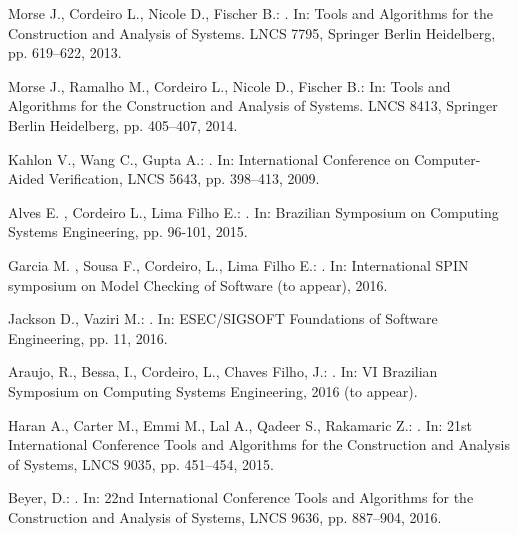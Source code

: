 \documentclass{acm_sen_article}
\begin{document}
{{\begin{thebibliography}{1}
Morse J., Cordeiro L., Nicole D., Fischer B.:
.
\newblock In: Tools and Algorithms for the Construction and Analysis of
  Systems. LNCS 7795, Springer Berlin Heidelberg, pp. 619--622, 2013.

Morse J., Ramalho M., Cordeiro L., Nicole D., Fischer B.:
\newblock In: Tools and Algorithms for the Construction and Analysis of
  Systems. LNCS 8413, Springer Berlin Heidelberg, pp. 405--407, 2014.

Kahlon V., Wang C., Gupta A.:
.
\newblock In: International Conference on Computer-Aided Verification, LNCS 5643, pp. 398--413, 2009.

Alves E. , Cordeiro L., Lima Filho E.:
. 
\newblock In: Brazilian Symposium on Computing Systems Engineering, pp. 96-101, 2015.

Garcia M. , Sousa F., Cordeiro, L., Lima Filho E.: 
. 
\newblock In: International SPIN symposium on Model Checking of Software (to appear), 2016.

Jackson D., Vaziri M.:
. 
\newblock In: ESEC/SIGSOFT Foundations of Software Engineering, pp. 11, 2016.

Araujo, R., Bessa, I., Cordeiro, L., Chaves Filho, J.:
. 
\newblock In: VI Brazilian Symposium on Computing Systems Engineering, 2016 (to appear).

Haran A., Carter M., Emmi M., Lal A., Qadeer S., Rakamaric Z.:
. 
\newblock In: 21st International Conference Tools and Algorithms for the Construction and Analysis of Systems, LNCS 9035, pp. 451--454, 2015.

Beyer, D.:
. 
\newblock In: 22nd International Conference Tools and Algorithms for the Construction and Analysis of Systems, LNCS 9636, pp. 887--904, 2016.


\end{thebibliography}}}
\end{document}
